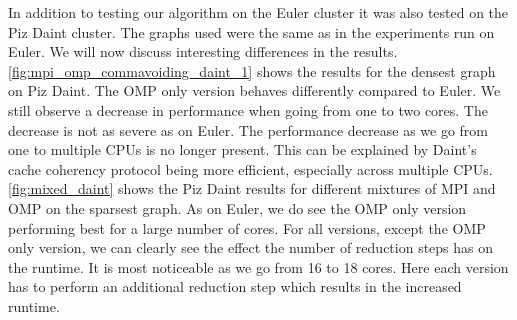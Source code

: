 In addition to testing our algorithm on the Euler cluster it was also tested on the Piz Daint cluster. The graphs used were the same as in the experiments run on Euler. We will now discuss interesting differences in the results.\\
\autoref{fig:mpi_omp_commavoiding_daint_1} shows the results for the densest graph on Piz Daint. The OMP only version behaves differently compared to Euler. We still observe a decrease in performance when going from one to two cores. The decrease is not as severe as on Euler. The performance decrease as we go from one to multiple CPUs is no longer present. This can be explained by Daint's cache coherency protocol being more efficient, especially across multiple CPUs.
\autoref{fig:mixed_daint} shows the Piz Daint results for different mixtures of MPI and OMP on the sparsest graph. As on Euler, we do see the OMP only version performing best for a large number of cores. For all versions, except the OMP only version, we can clearly see the effect the number of reduction steps has on the runtime. It is most noticeable as we go from 16 to 18 cores. Here each version has to perform an additional reduction step which results in the increased runtime.






